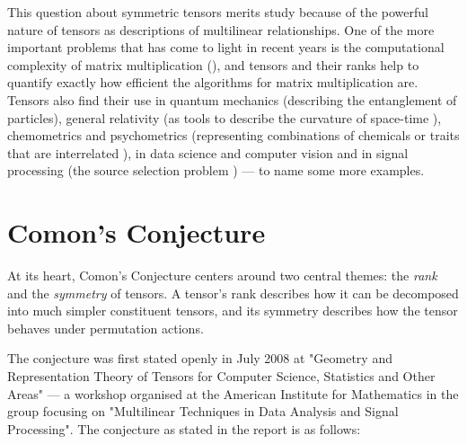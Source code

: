 \documentclass[../Lael_John_MasterThesis_Draft.tex]{subfiles}
\begin{document}
%
This question about symmetric tensors merits study because of the powerful nature of tensors as descriptions of multilinear relationships. One of the more important problems that has come to light in recent years is the computational complexity of matrix multiplication (\cite{landsberg_tensors_2012}), and tensors and their ranks help to quantify exactly how efficient the algorithms for matrix multiplication are. Tensors also find their use in quantum mechanics (describing the entanglement of particles), general relativity (as tools to describe the curvature of space-time \cite{carroll_spacetime_2019}), chemometrics and psychometrics (representing combinations of chemicals or traits that are interrelated \cite{zhang_comons_2016}), in data science and computer vision \cite{panagakis_tensor_2021} and in signal processing (the source selection problem \cite{landsberg_tensors_2012}) --- to name some more examples. 


\section*{Comon's Conjecture}\label{section:comonsconjecture}
At its heart, Comon's Conjecture centers around two central themes: the \textit{rank} and the \textit{symmetry} of tensors. A tensor's rank describes how it can be decomposed into much simpler constituent tensors, and its symmetry describes how the tensor behaves under permutation actions.

The conjecture was first stated openly in July 2008 at "Geometry and Representation Theory of Tensors for Computer Science, Statistics and Other Areas" --- a workshop organised at the American Institute for Mathematics \cite{oeding_report_2008} in the group focusing on "Multilinear Techniques in Data Analysis and Signal Processing". The conjecture as stated in the report is as follows:
\end{document}
